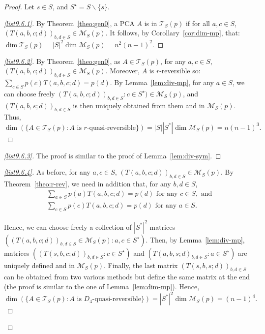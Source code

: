 \documentclass[10pt]{amsart}
\theoremstyle{definition}\newtheorem{defi}[theo]{Definition}\newtheorem{rema}[theo]{Remark}\newtheorem{exam}[theo]{Example}\newtheorem{exem}[theo]{Example}\newtheorem{nota}[theo]{Notation}
\newcounter{a}
\newcommand{\triang}[2]{\mathcal{T}_{#1} \left(#2 \right)}
\begin{document}
\begin{proof}
Let $s \in S$, and $S^\star = S \backslash \{s\}$.

\begin{proof}[{\eqref{list9.6.1}}]
By Theorem~\ref{theo:gen0}, a PCA $A$ is in $\triang{S}{p}$ if for all $a,c \in S$, $(T(a,b,c;d))_{b,d \in S} \in \mathcal{M}_S(p)$. It follows, by Corollary~\ref{cor:dim-mp}, that: $\dim \triang{S}{p} = |S|^2 \dim \mathcal{M}_S(p)= n^2 (n-1)^2$.
\let\qed\relax
\end{proof}

\begin{proof}[{\eqref{list9.6.2}}] By Theorem~\ref{theo:gen0}, as $A \in \triang{S}{p}$, for any $a,c \in S$, $(T(a,b,c;d))_{b,d \in S} \in \mathcal{M}_S(p)$. Moreover, $A$ is $r$-reversible so: $\sum_{c\in S} p(c) T(a,b,c;d) = p(d).$ By Lemma~\ref{lem:div-mp}, for any $a \in S$, we can choose freely $(T(a,b,c;d))_{b,d \in S} : c \in S^\star) \in \mathcal{M}_S(p)$, and $(T(a,b,s;d))_{b,d \in S}$ is then uniquely obtained from them and in $\mathcal{M}_S(p)$. Thus,
\[
\dim \left(\{A \in \triang{S}{p} : \text{$A$ is $r$-quasi-reversible}\} \right) = |S| |S^*| \dim \mathcal{M}_S(p) = n (n-1)^3.
\]
\let\qed\relax
\end{proof}

\begin{proof}[{\eqref{list9.6.3}}]
The proof is similar to the proof of Lemma~\ref{lem:div-sym}.
\let\qed\relax
\end{proof}

\begin{proof}[{\eqref{list9.6.4}}] As before, for any $a,c \in S$, $(T(a,b,c;d))_{b,d \in S} \in \mathcal{M}_S(p)$. By Theorem~\ref{theo:r-rev}, we need in addition that, for any $b,d \in S$,
\begin{align*}
& \sum_{a\in S} p(a) T(a,b,c;d) = p(d) \text{ for any } c \in S, \text{ and }\\
& \sum_{c\in S} p(c) T(a,b,c;d) = p(d) \text{ for any } a \in S.
\end{align*}

Hence, we can choose freely a collection of $|S^*|^2$ matrices $((T(a,b,c;d))_{b,d \in S} \in \mathcal{M}_S(p) : a,c \in S^\star)$. Then, by Lemma~\ref{lem:div-mp}, matrices $((T(s,b,c;d))_{b,d\in S} :c \in S^\star)$ and $(T(a,b,s;d)_{b,d \in S} : a \in S^\star)$ are uniquely defined and in $\mathcal{M}_S(p)$. Finally, the last matrix $(T(s,b,s;d))_{b,d \in S}$ can be obtained from two various methods but define the same matrix at the end (the proof is similar to the one of Lemma~\ref{lem:dim-mp}). Hence,
\[
\dim \left(\{A \in \triang{S}{p} : \text{$A$ is $D_4$-quasi-reversible}\} \right) = |S^*|^2 \dim \mathcal{M}_S(p) = (n-1)^4.
\]
\let\qed\relax
\end{proof}


\end{proof}
\end{document}

